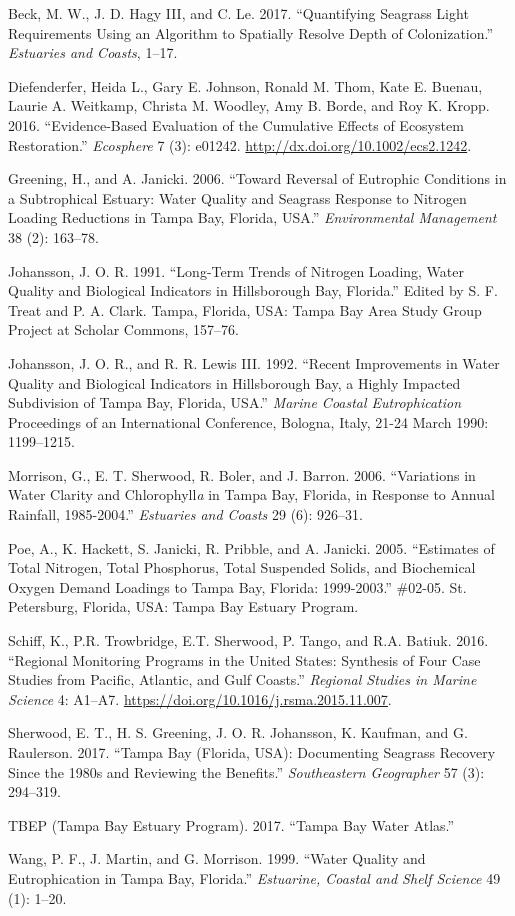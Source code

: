 \documentclass[]{article}
\begin{document}
\hypertarget{ref-Beck17c}{}
Beck, M. W., J. D. Hagy III, and C. Le. 2017. ``Quantifying Seagrass
Light Requirements Using an Algorithm to Spatially Resolve Depth of
Colonization.'' \emph{Estuaries and Coasts}, 1--17.

\hypertarget{ref-Diefenderfer16}{}
Diefenderfer, Heida L., Gary E. Johnson, Ronald M. Thom, Kate E. Buenau,
Laurie A. Weitkamp, Christa M. Woodley, Amy B. Borde, and Roy K. Kropp.
2016. ``Evidence-Based Evaluation of the Cumulative Effects of Ecosystem
Restoration.'' \emph{Ecosphere} 7 (3): e01242.
\url{http://dx.doi.org/10.1002/ecs2.1242}.

\hypertarget{ref-Greening06}{}
Greening, H., and A. Janicki. 2006. ``Toward Reversal of Eutrophic
Conditions in a Subtrophical Estuary: Water Quality and Seagrass
Response to Nitrogen Loading Reductions in Tampa Bay, Florida, USA.''
\emph{Environmental Management} 38 (2): 163--78.

\hypertarget{ref-Johansson91}{}
Johansson, J. O. R. 1991. ``Long-Term Trends of Nitrogen Loading, Water
Quality and Biological Indicators in Hillsborough Bay, Florida.'' Edited
by S. F. Treat and P. A. Clark. Tampa, Florida, USA: Tampa Bay Area
Study Group Project at Scholar Commons, 157--76.

\hypertarget{ref-Johansson92}{}
Johansson, J. O. R., and R. R. Lewis III. 1992. ``Recent Improvements in
Water Quality and Biological Indicators in Hillsborough Bay, a Highly
Impacted Subdivision of Tampa Bay, Florida, USA.'' \emph{Marine Coastal
Eutrophication} Proceedings of an International Conference, Bologna,
Italy, 21-24 March 1990: 1199--1215.

\hypertarget{ref-Morrison06}{}
Morrison, G., E. T. Sherwood, R. Boler, and J. Barron. 2006.
``Variations in Water Clarity and Chlorophyll\emph{a} in Tampa Bay,
Florida, in Response to Annual Rainfall, 1985-2004.'' \emph{Estuaries
and Coasts} 29 (6): 926--31.

\hypertarget{ref-Poe05}{}
Poe, A., K. Hackett, S. Janicki, R. Pribble, and A. Janicki. 2005.
``Estimates of Total Nitrogen, Total Phosphorus, Total Suspended Solids,
and Biochemical Oxygen Demand Loadings to Tampa Bay, Florida:
1999-2003.'' \#02-05. St. Petersburg, Florida, USA: Tampa Bay Estuary
Program.

\hypertarget{ref-Schiff16}{}
Schiff, K., P.R. Trowbridge, E.T. Sherwood, P. Tango, and R.A. Batiuk.
2016. ``Regional Monitoring Programs in the United States: Synthesis of
Four Case Studies from Pacific, Atlantic, and Gulf Coasts.''
\emph{Regional Studies in Marine Science} 4: A1--A7.
\url{https://doi.org/10.1016/j.rsma.2015.11.007}.

\hypertarget{ref-Sherwood17}{}
Sherwood, E. T., H. S. Greening, J. O. R. Johansson, K. Kaufman, and G.
Raulerson. 2017. ``Tampa Bay (Florida, USA): Documenting Seagrass
Recovery Since the 1980s and Reviewing the Benefits.''
\emph{Southeastern Geographer} 57 (3): 294--319.

\hypertarget{ref-TBEP17}{}
TBEP (Tampa Bay Estuary Program). 2017. ``Tampa Bay Water Atlas.''

\hypertarget{ref-Wang99}{}
Wang, P. F., J. Martin, and G. Morrison. 1999. ``Water Quality and
Eutrophication in Tampa Bay, Florida.'' \emph{Estuarine, Coastal and
Shelf Science} 49 (1): 1--20.
\end{document}
